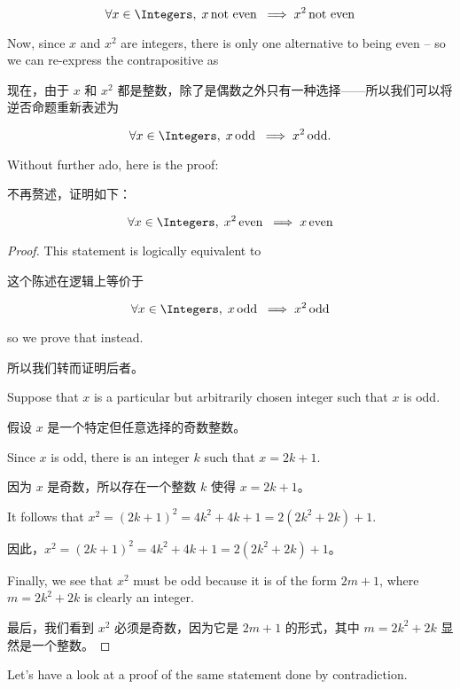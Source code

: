 \[ \forall x \in \Integers, \; x \, \mbox{not even} \; \implies x^2 \, \mbox{not even}
\]

Now, since $x$ and $x^2$ are integers, there is only one alternative to being
even -- so we can re-express the contrapositive as

现在，由于 $x$ 和 $x^2$ 都是整数，除了是偶数之外只有一种选择——所以我们可以将逆否命题重新表述为

\[ \forall x \in \Integers, \; x \, \mbox{odd} \; \implies x^2 \, \mbox{odd}.
\]

Without further ado, here is the proof:

不再赘述，证明如下：

\begin{thm}
      \[ \forall x \in \Integers, \; x^2 \, \mbox{even} \;
            \implies x \, \mbox{even}
      \]
\end{thm}
\begin{proof}
      This statement is logically equivalent to

      这个陈述在逻辑上等价于

      \[ \forall x \in \Integers, \; x \, \mbox{odd} \; \implies x^2 \, \mbox{odd}
      \]

      \noindent so we prove that instead.

      \noindent 所以我们转而证明后者。

      Suppose that $x$ is a particular but arbitrarily chosen integer
      such that $x$ is odd.

      假设 $x$ 是一个特定但任意选择的奇数整数。

      Since $x$ is odd, there is an integer $k$ such that
      $x=2k+1$.

      因为 $x$ 是奇数，所以存在一个整数 $k$ 使得 $x=2k+1$。

      It follows that
      $x^2 = (2k + 1)^2 = 4k^2 + 4k + 1 = 2(2k^2 + 2k) + 1$.

      因此，$x^2 = (2k + 1)^2 = 4k^2 + 4k + 1 = 2(2k^2 + 2k) + 1$。

      Finally, we see that $x^2$ must be odd because it is of the form $2m+1$, where
      $m = 2k^2 + 2k$ is clearly an integer.

      最后，我们看到 $x^2$ 必须是奇数，因为它是 $2m+1$ 的形式，其中 $m = 2k^2 + 2k$ 显然是一个整数。
\end{proof}

Let's have a look at a proof of the same statement done by contradiction.

